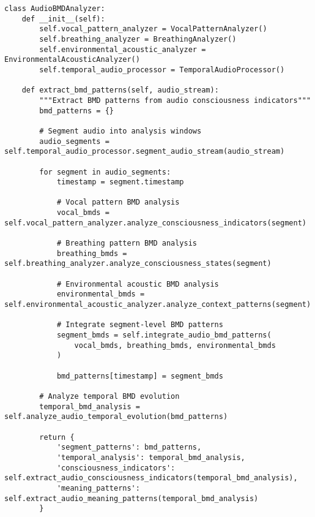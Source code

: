 \documentclass[12pt,a4paper]{article}
\begin{document}
\begin{lstlisting}[style=pythonstyle, caption=Audio BMD Pattern Recognition]
class AudioBMDAnalyzer:
    def __init__(self):
        self.vocal_pattern_analyzer = VocalPatternAnalyzer()
        self.breathing_analyzer = BreathingAnalyzer()
        self.environmental_acoustic_analyzer = EnvironmentalAcousticAnalyzer()
        self.temporal_audio_processor = TemporalAudioProcessor()
        
    def extract_bmd_patterns(self, audio_stream):
        """Extract BMD patterns from audio consciousness indicators"""
        bmd_patterns = {}
        
        # Segment audio into analysis windows
        audio_segments = self.temporal_audio_processor.segment_audio_stream(audio_stream)
        
        for segment in audio_segments:
            timestamp = segment.timestamp
            
            # Vocal pattern BMD analysis
            vocal_bmds = self.vocal_pattern_analyzer.analyze_consciousness_indicators(segment)
            
            # Breathing pattern BMD analysis
            breathing_bmds = self.breathing_analyzer.analyze_consciousness_states(segment)
            
            # Environmental acoustic BMD analysis
            environmental_bmds = self.environmental_acoustic_analyzer.analyze_context_patterns(segment)
            
            # Integrate segment-level BMD patterns
            segment_bmds = self.integrate_audio_bmd_patterns(
                vocal_bmds, breathing_bmds, environmental_bmds
            )
            
            bmd_patterns[timestamp] = segment_bmds
        
        # Analyze temporal BMD evolution
        temporal_bmd_analysis = self.analyze_audio_temporal_evolution(bmd_patterns)
        
        return {
            'segment_patterns': bmd_patterns,
            'temporal_analysis': temporal_bmd_analysis,
            'consciousness_indicators': self.extract_audio_consciousness_indicators(temporal_bmd_analysis),
            'meaning_patterns': self.extract_audio_meaning_patterns(temporal_bmd_analysis)
        }
    

\end{lstlisting}
\end{document}
